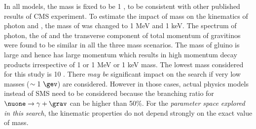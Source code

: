 In all models, the mass \grav is fixed to be 1 \gev, to be consistent with other published results of CMS experiment. 
To estimate the impact of \grav mass on the kinematics of photon and \grav, the mass of \grav was changed to 1 MeV and 1 keV. The \pt
spectrum of photon, the \pt of \grav and the transverse component of total momentum of gravitinos were found to be similar in all the
three \grav mass scenarios. The mass of gluino is large and hence \nuone has large momentum which 
results in high momentum decay products irrespective of 1 \gev or 1 MeV or 1 keV \grav mass.
The lowest \nuone mass considered for this study is 10 \gev. There \textit{may be} significant impact on the search if very low \nuone 
masses ($\sim 1\ \gev$) are considered. However in those cases, actual physics models instead of SMS need to be considered because the
branching ratio for $\nuone \to \gamma+\grav$ can be higher than 50\%. For the \textit{parameter
space explored in this search}, the kinematic properties do not depend strongly on the exact value of \grav mass.
